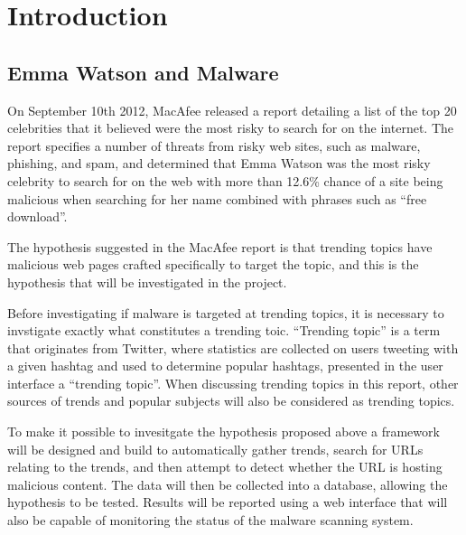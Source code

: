 \section{Introduction}

\subsection{Emma Watson and Malware}
On September 10th 2012, MacAfee released a report detailing a list of the top 20
celebrities that it believed were the most risky to search for on the internet.
The report specifies a number of threats from risky web sites, such as malware,
phishing, and spam, and determined that Emma Watson was the most risky celebrity
to search for on the web with more than 12.6\% chance of a site being malicious
when searching for her name combined with phrases such as ``free download''.

The hypothesis suggested in the MacAfee report is that trending topics have
malicious web pages crafted specifically to target the topic, and this is the
hypothesis that will be investigated in the project.

Before investigating if malware is targeted at trending topics, it is necessary to
invstigate exactly what constitutes a trending toic. ``Trending topic'' is a term
that originates from Twitter, where statistics are collected on users tweeting
with a given hashtag and used to determine popular hashtags, presented in the
user interface a ``trending topic''. When discussing trending topics in this
report, other sources of trends and popular subjects will also be considered as
trending topics.

To make it possible to invesitgate the hypothesis proposed above a framework
will be designed and build to automatically gather trends, search for URLs
relating to the trends, and then attempt to detect whether the URL is hosting
malicious content. The data will then be collected into a database, allowing the
hypothesis to be tested. Results will be reported using a web interface that
will also be capable of monitoring the status of the malware scanning system.


